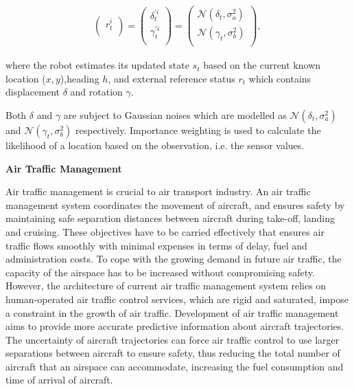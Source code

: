 \begin{equation}
\begin{aligned}
  \begin{pmatrix}
    r^i_{t}    \\ 
  \end{pmatrix}
  =
  \begin{pmatrix}
    \delta^{'i}_{t}    \\ 
    \gamma^{'i}_{t}    \\ 
  \end{pmatrix}
  =
  \begin{pmatrix}
  	\mathcal{N}(\delta_{t},\sigma_a^2) \\
		\mathcal{N}(\gamma_{t},\sigma_b^2) \\
  \end{pmatrix}
	\mbox{, }
\end{aligned}
\label{eq:mcl_r}
\end{equation}

where the robot estimates its updated state $s_t$ based on the current known location ($x, y$),heading $h$, and external reference status $r_t$ which contains displacement $\delta$ and rotation $\gamma$.

Both $\delta$ and $\gamma$ are subject to Gaussian noises which are modelled as $\mathcal{N}(\delta_{t},\sigma_a^2)$ and $\mathcal{N}(\gamma_{t},\sigma_b^2)$ respectively.
Importance weighting is used to calculate the likelihood of a location based on the observation, i.e. the sensor values.

\textbf{Air Traffic Management}

Air traffic management is crucial to air transport industry.
An air traffic management system coordinates the movement of aircraft, and ensures safety by maintaining safe separation distances between aircraft during take-off, landing and cruising.
These objectives have to be carried effectively that ensures air traffic flows smoothly with minimal expenses in terms of delay, fuel and administration costs. 
To cope with the growing demand in future air traffic, the capacity of the airspace has to be increased without compromising safety.
However, the architecture of current air traffic management system relies on human-operated air traffic control services, which are rigid and saturated, impose a constraint in the growth of air traffic.
Development of air traffic management aims to provide more accurate predictive information about aircraft trajectories.
The uncertainty of aircraft trajectories can force air traffic control to use larger separations between aircraft to ensure safety, thus reducing the total number of aircraft that an airspace can accommodate, increasing the fuel consumption and time of arrival of aircraft.

